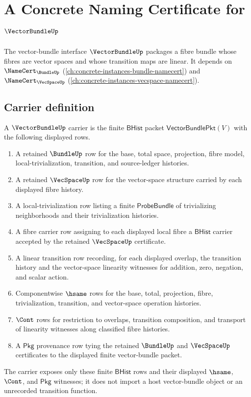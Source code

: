 \chapter{A Concrete Naming Certificate for $\VectorBundleUp$}
\label{ch:concrete-instances-vectorbundle-namecert}

The vector-bundle interface $\VectorBundleUp$ packages a fibre bundle whose fibres are vector spaces and whose transition maps are linear. It depends on $\NameCert_{\BundleUp}$ (\autoref{ch:concrete-instances-bundle-namecert}) and $\NameCert_{\VecSpaceUp}$ (\autoref{ch:concrete-instances-vecspace-namecert}).

\section{Carrier definition}
\label{sec:vectorbundle-carrier}

\begin{definition}
\label{def:vectorbundle-carrier}
A $\VectorBundleUp$ carrier is the finite $\mathsf{BHist}$ packet
$\mathsf{VectorBundlePkt}(V)$ with the following displayed rows.
\begin{enumerate}
  \item A retained $\BundleUp$ row for the base, total space, projection,
  fibre model, local-trivialization, transition, and source-ledger histories.
  \item A retained $\VecSpaceUp$ row for the vector-space structure carried by
  each displayed fibre history.
  \item A local-trivialization row listing a finite $\mathsf{ProbeBundle}$ of
  trivializing neighborhoods and their trivialization histories.
  \item A fibre carrier row assigning to each displayed local fibre a
  $\mathsf{BHist}$ carrier accepted by the retained $\VecSpaceUp$ certificate.
  \item A linear transition row recording, for each displayed overlap, the
  transition history and the vector-space linearity witnesses for addition,
  zero, negation, and scalar action.
  \item Componentwise $\hsame$ rows for the base, total, projection, fibre,
  trivialization, transition, and vector-space operation histories.
  \item $\Cont$ rows for restriction to overlaps, transition composition, and
  transport of linearity witnesses along classified fibre histories.
  \item A $\mathsf{Pkg}$ provenance row tying the retained $\BundleUp$ and
  $\VecSpaceUp$ certificates to the displayed finite vector-bundle packet.
\end{enumerate}
The carrier exposes only these finite $\mathsf{BHist}$ rows and their
displayed $\hsame$, $\Cont$, and $\mathsf{Pkg}$ witnesses; it does not import a
host vector-bundle object or an unrecorded transition function.
\end{definition}

